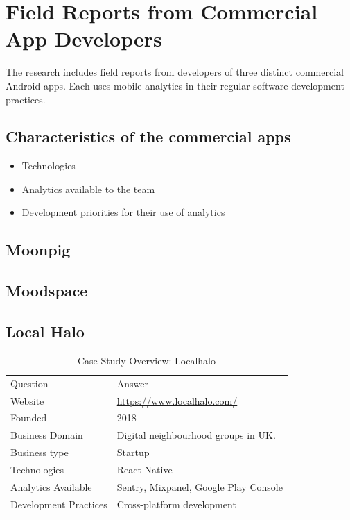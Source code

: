 \section{Field Reports from Commercial App Developers}
The research includes field reports from developers of three distinct commercial Android apps. Each uses mobile analytics in their regular software development practices.

\subsection{Characteristics of the commercial apps}

\begin{itemize}
    \item Technologies
    \item Analytics available to the team
    \item Development priorities for their use of analytics
\end{itemize}

\subsection{Moonpig}


\subsection{Moodspace}


\subsection{Local Halo}

\begin{table}[ht]
    \centering
    \small
    \begin{tabular}{ll}
       Question &Answer  \\
       Website &\url{https://www.localhalo.com/} \\
       Founded &2018\\
       Business Domain &Digital neighbourhood groups in UK.\\
       Business type &Startup \\
       Technologies  &React Native \\
       Analytics Available &Sentry, Mixpanel, Google Play Console \\
       Development Practices &Cross-platform development
    \end{tabular}
    \caption{Case Study Overview: Localhalo}
    \label{tab:local_halo_anaytics_overview}
\end{table}


